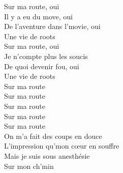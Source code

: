 \documentclass{novel}
\begin{document}
\begin{multicols}{2}
Sur ma route, oui \\
Il y a eu du move, oui \\
De l'aventure dans l'movie, oui \\
Une vie de roots \\
Sur ma route, oui \\
Je n'compte plus les soucis \\
De quoi devenir fou, oui \\
Une vie de roots \\

Sur ma route \\
Sur ma route \\
Sur ma route \\
Sur ma route \\

Sur ma route \\
On m'a fait des coups en douce \\
L'impression qu'mon cœur en souffre \\
Mais je suis sous anesthésie \\
Sur mon ch'min \\
\end{multicols}
\end{document}
